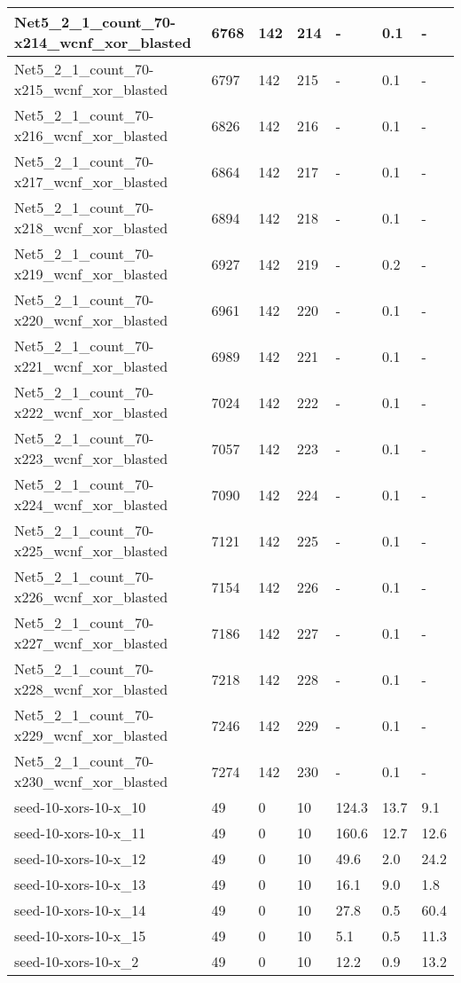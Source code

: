 \begin{scriptsize}
\begin{longtable}{|p{5cm}|l|l|l|l|l|l|}
Net5\_2\_1\_count\_70-x214\_wcnf\_xor\_blasted&6768&142&214&-&0.1&- \\ \hline 
Net5\_2\_1\_count\_70-x215\_wcnf\_xor\_blasted&6797&142&215&-&0.1&- \\ \hline 
Net5\_2\_1\_count\_70-x216\_wcnf\_xor\_blasted&6826&142&216&-&0.1&- \\ \hline 
Net5\_2\_1\_count\_70-x217\_wcnf\_xor\_blasted&6864&142&217&-&0.1&- \\ \hline 
Net5\_2\_1\_count\_70-x218\_wcnf\_xor\_blasted&6894&142&218&-&0.1&- \\ \hline 
Net5\_2\_1\_count\_70-x219\_wcnf\_xor\_blasted&6927&142&219&-&0.2&- \\ \hline 
Net5\_2\_1\_count\_70-x220\_wcnf\_xor\_blasted&6961&142&220&-&0.1&- \\ \hline 
Net5\_2\_1\_count\_70-x221\_wcnf\_xor\_blasted&6989&142&221&-&0.1&- \\ \hline 
Net5\_2\_1\_count\_70-x222\_wcnf\_xor\_blasted&7024&142&222&-&0.1&- \\ \hline 
Net5\_2\_1\_count\_70-x223\_wcnf\_xor\_blasted&7057&142&223&-&0.1&- \\ \hline 
Net5\_2\_1\_count\_70-x224\_wcnf\_xor\_blasted&7090&142&224&-&0.1&- \\ \hline 
Net5\_2\_1\_count\_70-x225\_wcnf\_xor\_blasted&7121&142&225&-&0.1&- \\ \hline 
Net5\_2\_1\_count\_70-x226\_wcnf\_xor\_blasted&7154&142&226&-&0.1&- \\ \hline 
Net5\_2\_1\_count\_70-x227\_wcnf\_xor\_blasted&7186&142&227&-&0.1&- \\ \hline 
Net5\_2\_1\_count\_70-x228\_wcnf\_xor\_blasted&7218&142&228&-&0.1&- \\ \hline 
Net5\_2\_1\_count\_70-x229\_wcnf\_xor\_blasted&7246&142&229&-&0.1&- \\ \hline 
Net5\_2\_1\_count\_70-x230\_wcnf\_xor\_blasted&7274&142&230&-&0.1&- \\ \hline 
seed-10-xors-10-x\_10&49&0&10&124.3&13.7&9.1 \\ \hline 
seed-10-xors-10-x\_11&49&0&10&160.6&12.7&12.6 \\ \hline 
seed-10-xors-10-x\_12&49&0&10&49.6&2.0&24.2 \\ \hline 
seed-10-xors-10-x\_13&49&0&10&16.1&9.0&1.8 \\ \hline 
seed-10-xors-10-x\_14&49&0&10&27.8&0.5&60.4 \\ \hline 
seed-10-xors-10-x\_15&49&0&10&5.1&0.5&11.3 \\ \hline 
seed-10-xors-10-x\_2&49&0&10&12.2&0.9&13.2 \\ \hline 

\end{longtable}
\end{scriptsize}
